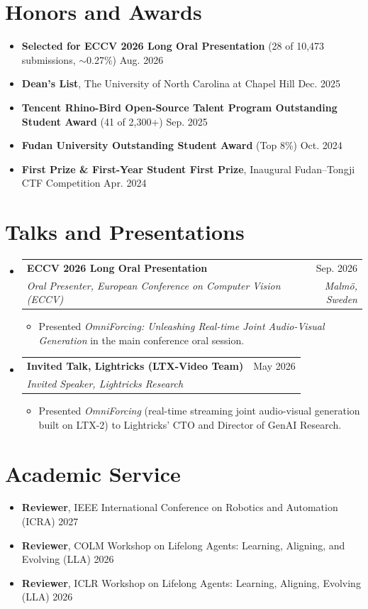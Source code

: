 \documentclass[a4paper,11pt]{article}
\makeatletter
\newcommand{\resumeItem}[1]{
  \item\small{#1}
}
\newcommand{\resumeSubheading}[4]{
  \item
    \begin{tabular*}{\linewidth}[t]{l@{\extracolsep{\fill}}r}
      \textbf{#1} & \small #2 \\
      \textit{\small#3} & \textit{\small #4} \\
    \end{tabular*}\vspace{-3pt}
}
\newcommand{\resumeProjectHeading}[2]{
  \item\small #1 \hfill #2
}
\newcommand{\resumeSubHeadingListStart}{\begin{itemize}[leftmargin=0.10in, label={}, topsep=1pt, itemsep=4pt]}
\newcommand{\resumeSubHeadingListEnd}{\end{itemize}}
\newcommand{\resumeCompactListStart}{\begin{itemize}[leftmargin=0.10in, label={}, topsep=1.5pt, itemsep=2.5pt, parsep=0pt]}
\newcommand{\resumeCompactListEnd}{\end{itemize}}
\newcommand{\resumeItemListStart}{\begin{itemize}[leftmargin=0.18in, topsep=2.5pt, itemsep=2pt, parsep=0pt]}
\newcommand{\resumeItemListEnd}{\end{itemize}}
\makeatother
\begin{document}
\section{Honors and Awards}
  \resumeCompactListStart
    \resumeProjectHeading{\textbf{Selected for ECCV 2026 Long Oral Presentation} (28 of 10,473 submissions, $\sim$0.27\%)}{Aug. 2026}
    \resumeProjectHeading{\textbf{Dean's List}, The University of North Carolina at Chapel Hill}{Dec. 2025}
    \resumeProjectHeading{\textbf{Tencent Rhino-Bird Open-Source Talent Program Outstanding Student Award} (41 of 2,300+)}{Sep. 2025}
    \resumeProjectHeading{\textbf{Fudan University Outstanding Student Award} (Top 8\%)}{Oct. 2024}
    \resumeProjectHeading{\textbf{First Prize \& First-Year Student First Prize}, Inaugural Fudan--Tongji CTF Competition}{Apr. 2024}
  \resumeCompactListEnd

\section{Talks and Presentations}
  \resumeSubHeadingListStart
    \resumeSubheading
      {ECCV 2026 Long Oral Presentation}{Sep. 2026}
      {Oral Presenter, European Conference on Computer Vision (ECCV)}{Malm\"o, Sweden}
      \resumeItemListStart
        \resumeItem{Presented \textit{OmniForcing: Unleashing Real-time Joint Audio-Visual Generation} in the main conference oral session.}
      \resumeItemListEnd
    \resumeSubheading
      {Invited Talk, Lightricks (LTX-Video Team)}{May 2026}
      {Invited Speaker, Lightricks Research}{}
      \resumeItemListStart
        \resumeItem{Presented \textit{OmniForcing} (real-time streaming joint audio-visual generation built on LTX-2) to Lightricks' CTO and Director of GenAI Research.}
      \resumeItemListEnd
  \resumeSubHeadingListEnd

\section{Academic Service}
  \resumeCompactListStart
    \resumeProjectHeading{\textbf{Reviewer}, IEEE International Conference on Robotics and Automation (ICRA)}{2027}
    \resumeProjectHeading{\textbf{Reviewer}, COLM Workshop on Lifelong Agents: Learning, Aligning, and Evolving (LLA)}{2026}
    \resumeProjectHeading{\textbf{Reviewer}, ICLR Workshop on Lifelong Agents: Learning, Aligning, Evolving (LLA)}{2026}
  \resumeCompactListEnd
\end{document}

